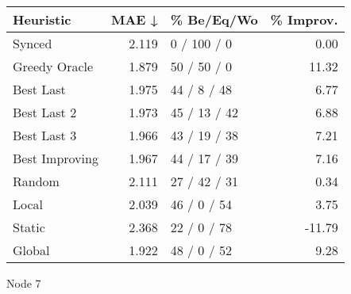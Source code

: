 \begin{tabular}{lrlr}
\toprule
\textbf{Heuristic} & \textbf{MAE ↓} & \textbf{\% Be/Eq/Wo} & \textbf{\% Improv.} \\
\midrule
            Synced &          2.119 &          0 / 100 / 0 &                0.00 \\
     Greedy Oracle &          1.879 &          50 / 50 / 0 &               11.32 \\
         Best Last &          1.975 &          44 / 8 / 48 &                6.77 \\
       Best Last 2 &          1.973 &         45 / 13 / 42 &                6.88 \\
       Best Last 3 &          1.966 &         43 / 19 / 38 &                7.21 \\
    Best Improving &          1.967 &         44 / 17 / 39 &                7.16 \\
            Random &          2.111 &         27 / 42 / 31 &                0.34 \\
             Local &          2.039 &          46 / 0 / 54 &                3.75 \\
            Static &          2.368 &          22 / 0 / 78 &              -11.79 \\
            Global &          1.922 &          48 / 0 / 52 &                9.28 \\
\bottomrule
\end{tabular}
\caption{Node 7}
\label{tab:ds_non_lr05_le2_bs4_7}
